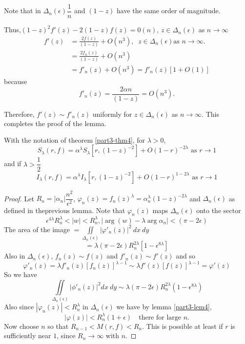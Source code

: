Note that in $\Delta_{n}(\epsilon)\dfrac{1}{n}$ and $(1-z)$ have the
same order of magnitude.

Thus,\pageoriginale $(1-z)^{2}f'(z)-2(1-z)f(z)=0(n)$, $z\in
\Delta_{n}(\epsilon)$ as $n\to \infty$
\begin{align*}
f'(z) &= \frac{2f(z)}{(1-z)}+O(n^{3}), \;\; z\in\Delta_{n}(\epsilon)\text{
  \  as \ } n\to \infty.\\
&= \frac{2f_{n}(z)}{(1-z)}+O(n^{3})\\
&= f'_{n}(z)+O(n^{3})=f'_{n}(z)[1+O(1)]
\end{align*}
because
$$
f'_{n}(z)=\frac{2\alpha n}{(1-z)}=O(n^{3}).
$$

Therefore, $f'(z)\sim f'_{n}(z)$ uniformly for
$z\in\Delta_{n}(\epsilon)$ as $n\to \infty$. This completes the proof
of the lemma.

\begin{lem}\label{part3-lem5}
With the notation of theorem \ref{part3-thm4}, for $\lambda>0$,
$$
S_{\lambda}(r,f)=\alpha^{\lambda}S_{\lambda}[r,(1-z)^{-2}] +
O(1-r)^{-2\lambda}\text{ 
  \  as \ }r\to 1
$$
and if $\lambda>\dfrac{1}{2}$
$$
I_{\lambda}(r,f)=\alpha^{\lambda}I_{\lambda}[r,(1-z)^{-2}] + O
(1-r)^{1-2\lambda}\text{  \ as \ } r\to 1
$$
\end{lem}

\begin{proof}
Let $R_{n}=|\alpha_{n}|\dfrac{n^{2}}{\epsilon^{2}}$,
$\varphi_{n}(z)=f_{n}(z)^{\lambda}=\alpha^{\lambda}_{n}(1-z)^{-2\lambda}$
and $\Delta_{n}(\epsilon)$ as defined in the\pageoriginale previous
lemma. Note that $\varphi_{n}(z)$ maps $\Delta_{n}(\epsilon)$ onto the
sector
$$
\epsilon^{4\lambda}R^{\lambda}_{n}<|w|<R^{\lambda}_{n},
|\arg(w)-\lambda\arg\alpha_{n}|<(\pi -2\epsilon)
$$
The area of the image \; $=\iint\limits_{\Delta_{n}(\epsilon)}
|\varphi'_{n}(z)|^{2}\ dx\ dy $
\begin{equation*}
=\lambda(\pi-2\epsilon)R^{2\lambda}_{n} [1-\epsilon^{8\lambda}]
\tag{3.2.1}\label{part3-eq3.2.1}  
\end{equation*}
Also in $\Delta_{n}(\epsilon)$, $f_{n}(z)\sim f(z)$ and $f'_{n}(z)\sim
f'(z)$ and so
$$
\varphi'_{n}(z)=\lambda f'_{n}(z)[f_{n}(z)]^{\lambda-1}\sim \lambda
f'(z)[f(z)]^{\lambda-1}=\varphi'(z) 
$$
So we have 
\begin{equation*}
\iint\limits_{\Delta_{n}(\epsilon)} |\phi'_n(z)|^{2}dx\ dy\sim
\lambda(\pi-2\epsilon)R^{2\lambda}_{n}(1-\epsilon^{8\lambda})\tag{3.2.2}\label{part3-eq3.2.2} 
\end{equation*}
Also since $|\varphi_{n}(z)|<R^{\lambda}_{n}$ in
$\Delta_{n}(\epsilon)$ we have by lemma \ref{part3-lem4},
$$
|\varphi(z)|<R^{\lambda}_{n}(1+\epsilon)\quad\text{there for large \ } n.
$$
Now choose $n$ so that $R_{n-1}<M(r,f)<R_{n}$. This is possible at
least if $r$ is sufficiently near $1$, since $R_{n}\to \infty$ with $n$.
\end{proof}


